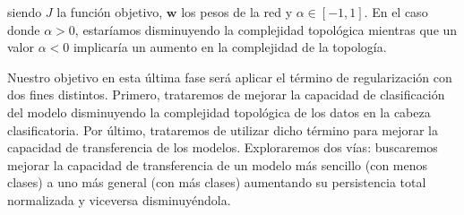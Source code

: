 siendo $J$ la función objetivo, $\mathbf{w}$ los pesos de la red y
$\alpha \in [-1, 1]$. En el caso donde $\alpha > 0$, estaríamos disminuyendo la
complejidad topológica mientras que un valor $\alpha < 0$ implicaría un aumento
en la complejidad de la topología.

Nuestro objetivo en esta última fase será aplicar el término de regularización
con dos fines distintos. Primero, trataremos de mejorar la capacidad de
clasificación del modelo disminuyendo la complejidad topológica de los datos en
la cabeza clasificatoria. Por último, trataremos de utilizar dicho término para
mejorar la capacidad de transferencia de los modelos. Exploraremos dos vías:
buscaremos mejorar la capacidad de transferencia de un modelo más sencillo (con menos
clases) a uno más general (con más clases) aumentando su persistencia total
normalizada y viceversa disminuyéndola.

\endinput
